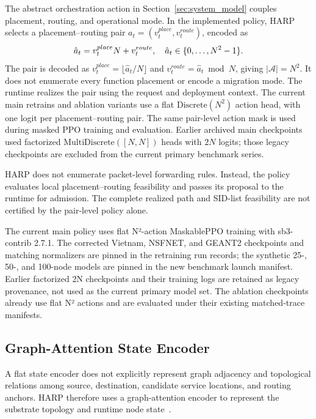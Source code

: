 \documentclass[final,5p]{elsarticle}
\newcommand{\rev}[1]{\textcolor{revisiongreen}{#1}}
\let\newrev\rev
\begin{document}
The abstract orchestration action in Section~\ref{sec:system_model} couples placement, routing, and operational mode. \rev{In the implemented policy, HARP selects a placement--routing pair \(a_t=(v_t^{place},v_t^{route})\), encoded as}
\begin{equation}
\rev{\hat a_t=v_t^{place}N+v_t^{route},\quad \hat a_t\in\{0,\ldots,N^2-1\}.}
\label{eq:harp_action_encoding}
\end{equation}
\rev{The pair is decoded as \(v_t^{place}=\lfloor\hat a_t/N\rfloor\) and \(v_t^{route}=\hat a_t\bmod N\), giving \(|\mathcal A|=N^2\). It does not enumerate every function placement or encode a migration mode. The runtime realizes the pair using the request and deployment context. The current main retrains and ablation variants use a flat \(\mathrm{Discrete}(N^2)\) action head, with one logit per placement--routing pair. The same pair-level action mask is used during masked PPO training and evaluation. Earlier archived main checkpoints used factorized \(\mathrm{MultiDiscrete}([N,N])\) heads with \(2N\) logits; those legacy checkpoints are excluded from the current primary benchmark series.}

HARP does not enumerate packet-level forwarding rules. Instead, \rev{the policy evaluates local placement--routing feasibility and passes its proposal to the runtime for admission. The complete realized path and SID-list feasibility are not certified by the pair-level policy alone.}

\newrev{The current main policy uses flat N²-action MaskablePPO training with sb3-contrib 2.7.1. The corrected Vietnam, NSFNET, and GEANT2 checkpoints and matching normalizers are pinned in the retraining run records; the synthetic 25-, 50-, and 100-node models are pinned in the new benchmark launch manifest. Earlier factorized 2N checkpoints and their training logs are retained as legacy provenance, not used as the current primary model set. The ablation checkpoints already use flat N² actions and are evaluated under their existing matched-trace manifests.}

\subsection{Graph-Attention State Encoder}
\label{subsec:harp_gat}

A flat state encoder \newrev{does not explicitly represent graph adjacency and topological relations} among source, destination, candidate service locations, and routing anchors. HARP therefore uses a graph-attention encoder to represent the substrate topology and runtime node state~\cite{velickovic2018graph}.
\end{document}
